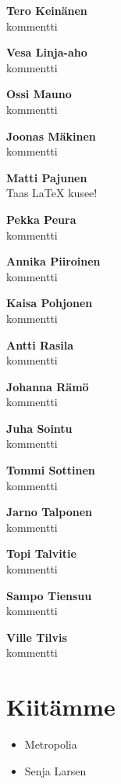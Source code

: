 \textbf{Tero Keinänen}
\\kommentti

\textbf{Vesa Linja-aho}
\\kommentti

\textbf{Ossi Mauno}
\\kommentti

\textbf{Joonas Mäkinen}
\\kommentti

\textbf{Matti Pajunen}
\\Taas LaTeX kusee! 

\textbf{Pekka Peura}
\\kommentti

\textbf{Annika Piiroinen}
\\kommentti

\textbf{Kaisa Pohjonen}
\\kommentti

\textbf{Antti Rasila}
\\kommentti

\textbf{Johanna Rämö}
\\kommentti

\textbf{Juha Sointu}
\\kommentti

\textbf{Tommi Sottinen}
\\kommentti

\textbf{Jarno Talponen}
\\kommentti

\textbf{Topi Talvitie}
\\kommentti

\textbf{Sampo Tiensuu}
\\kommentti

\textbf{Ville Tilvis}
\\kommentti

\section*{Kiitämme}
\begin{itemize}
\item Metropolia
\item Senja Larsen
\end{itemize}








